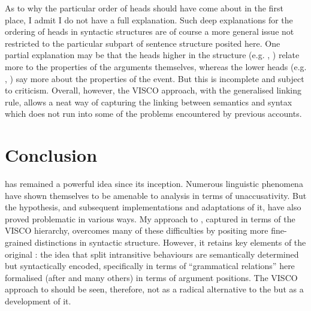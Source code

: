 \documentclass[output=paper]{langsci/langscibook}
\begin{document}
As to why the particular order of heads should have come about in the first
place, I admit I do not have a full explanation. Such deep explanations for the
ordering of heads in syntactic structures are of course a more general issue
not restricted to the particular subpart of sentence structure posited here.
One partial explanation may be that the heads higher in the structure (e.g.
\Volition{}, \Initiation{}) relate more to the properties of the arguments
themselves, whereas the lower heads (e.g. \Change{}, \Oriented{}) say more about the
properties of the event. But this is incomplete and subject to criticism.
Overall, however, the VISCO approach, with the generalised linking rule, allows
a neat way of capturing the linking between semantics and syntax which does not
run into some of the problems encountered by previous accounts.

\section{Conclusion}\label{sec:baker:conclusion}

  has remained a powerful
idea since its inception. Numerous linguistic phenomena have shown themselves
to be amenable to analysis in terms of unaccusativity. But the hypothesis, and
subsequent implementations and adaptations of it, have also proved problematic
in various ways. My approach to , captured in terms
of the VISCO hierarchy, overcomes many of these difficulties by positing more
fine-grained distinctions in syntactic structure. However, it retains key
elements of the original : the idea that split
intransitive behaviours are semantically determined but syntactically encoded,
specifically in terms of \enquote{grammatical relations} here formalised (after
\citealt{Burzio1986} and many others) in terms of argument positions. The VISCO
approach to  should be seen, therefore, not as a
radical alternative to the  but as a development
of it.

\printchapterglossary{}

{\sloppy
\printbibliography[heading=subbibliography,notkeyword=this]
}
\end{document}
